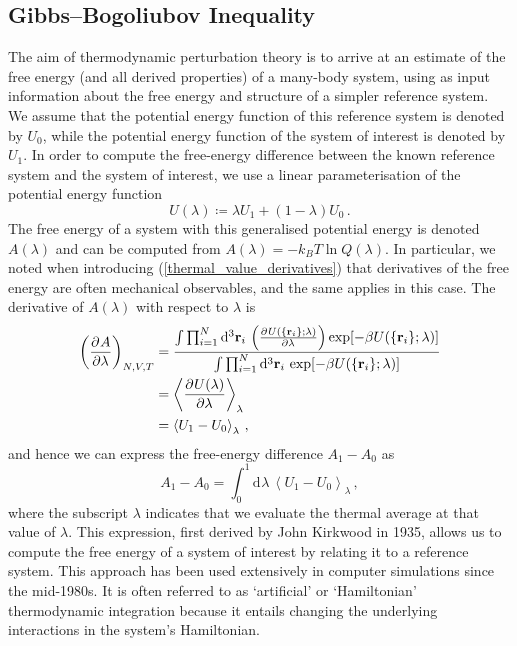 \documentclass{article}
\theoremstyle{plain}\theoremheaderfont{\normalfont\bfseries}\theorembodyfont{\rmfamily}\theoremseparator{.}\newtheorem*{thm}{Theorem}\newtheorem*{law}{Law}\newtheorem*{pos}{Postulate}
\numberwithin{equation}{section}
\newcommand{\dd}[2][]{\mathrm{d}^{#1} #2\,}
\newcommand{\pdv}[3][]{\frac{\partial^{#1} #2}{{\partial #3}^{#1}}}
\newcommand{\eval}[1]{\left\langle #1 \right\rangle}
\newcommand{\vb}[1]{\bm{\mathrm{#1}}}
\begin{document}
    \subsection{Gibbs--Bogoliubov Inequality}
    The aim of thermodynamic perturbation theory is to arrive at an estimate of the free energy (and all derived properties) of a many-body system, using as input information about the free energy and structure of a simpler reference system. We assume that the potential energy function of this reference system is denoted by \(U_0\), while the potential energy function of the system of interest is denoted by \(U_1\). In order to compute the free-energy difference between the known reference system and the system of interest, we use a linear parameterisation of the potential energy function
    \begin{equation}
        U(\lambda)\coloneqq \lambda U_1+(1-\lambda)U_0\,.
    \end{equation}
    The free energy of a system with this generalised potential energy is denoted \(A(\lambda)\) and can be computed from \(A(\lambda)=-k_B T\ln Q(\lambda)\). In particular, we noted when introducing (\ref{thermal_value_derivatives}) that derivatives of the free energy are often mechanical observables, and the same applies in this case. The derivative of \(A(\lambda)\) with respect to \(\lambda\) is
    \begin{align}
        \left(\pdv{A}{\lambda}\right)_{N,V,T}&=\frac{\int\prod_{i=1}^{N}\dd[3]{\vb{r}_i}\left(\pdv{U(\{\vb{r}_i\};\lambda)}{\lambda}\right)\exp[-\beta U(\{\vb{r}_i\};\lambda)]}{\int\prod_{i=1}^{N}\dd[3]{\vb{r}_i}\exp[-\beta U(\{\vb{r}_i\};\lambda)]}\notag\\
        &=\eval{\pdv{U(\lambda)}{\lambda}}_{\lambda}\notag\\
        &=\eval{U_1-U_0}_\lambda\,,
    \end{align}
    and hence we can express the free-energy difference \(A_1-A_0\) as
    \begin{equation}
        A_1-A_0=\int_{0}^{1}\dd{\lambda}\eval{U_1-U_0}_\lambda\,,
    \end{equation}
    where the subscript \(\lambda\) indicates that we evaluate the thermal average at that value of \(\lambda\). This expression, first derived by John Kirkwood in 1935, allows us to compute the free energy of a system of interest by relating it to a reference system. This approach has been used extensively in computer simulations since the mid-1980s. It is often referred to as `artificial' or `Hamiltonian' thermodynamic integration because it entails changing the underlying interactions in the system's Hamiltonian.
\end{document}
